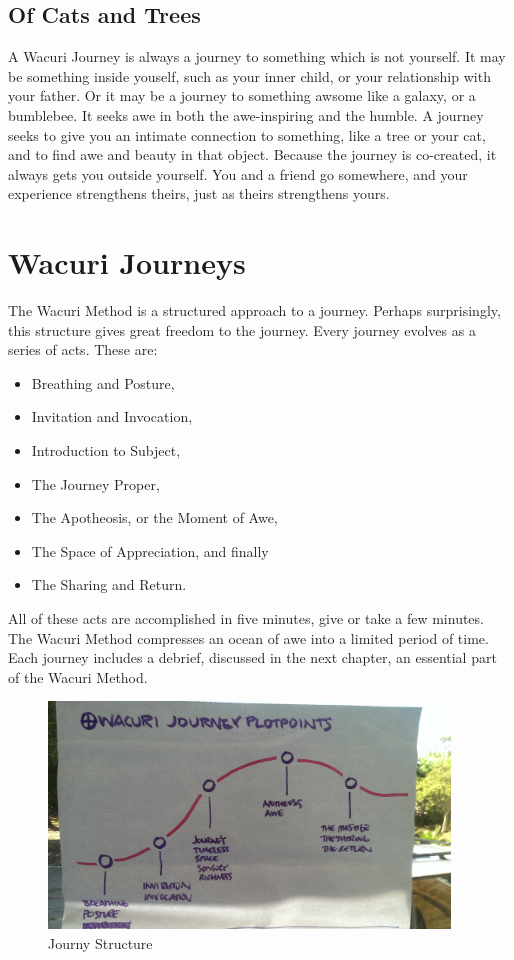 \documentclass[12pt]{book}
\begin{document}
\section{Of Cats and Trees}

A Wacuri Journey is always a journey to something which is not yourself.
It may be something inside youself, such as your inner child, or
your relationship with your father. Or it may be a journey to something
awsome like a galaxy, or a bumblebee. It seeks awe in both the awe-inspiring
and the humble. A journey seeks to give you an intimate connection
to something, like a tree or your cat, and to find awe and beauty in
that object. Because the journey is co-created, it always gets you
outside yourself. You and a friend go somewhere, and your experience
strengthens theirs, just as theirs strengthens yours.


\chapter{Wacuri Journeys}

The Wacuri Method is a structured approach to a journey. Perhaps
surprisingly, this structure gives great freedom to the journey.
Every journey evolves as a series of acts.
These are:
\begin{itemize}
\item Breathing and Posture,
\item Invitation and Invocation,
\item Introduction to Subject,
\item The Journey Proper,
\item The Apotheosis, or the Moment of Awe,
\item The Space of Appreciation, and finally
  \item The Sharing and Return.
\end{itemize}

All of these acts are accomplished in five minutes, give or take a few
minutes. The Wacuri Method compresses an ocean of awe into a
limited period of time.
Each journey includes a debrief, discussed in the next chapter,
an essential part of the Wacuri Method.

\begin{figure}
  \centering
     \includegraphics[width=0.95\textwidth]{WacuriFigures/JourneyStructure.jpg}
     \caption{Journy Structure}
  \label{fig:closeup}     
\end{figure}
\end{document}
